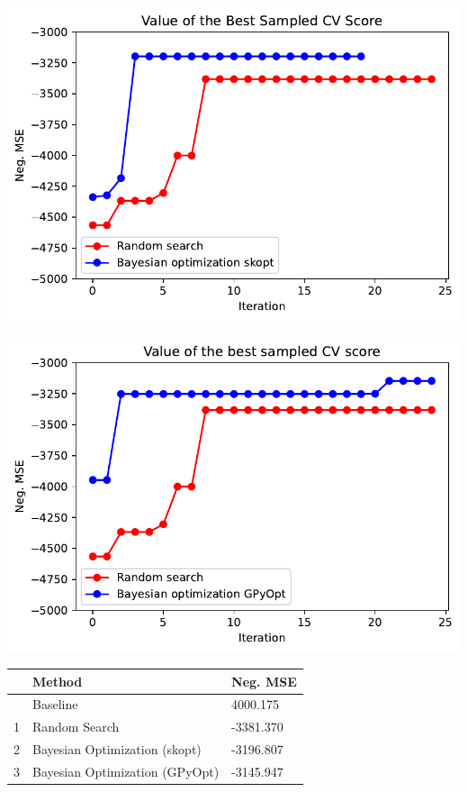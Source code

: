 \documentclass[
  12pt,
  letterpaper,
  DIV=11,
  numbers=noendperiod]{scrartcl}
\begin{document}
\includegraphics{ProyFinal_OptBayesiana_2024_files/figure-pdf/cell-16-output-1.pdf}

\includegraphics{ProyFinal_OptBayesiana_2024_files/figure-pdf/cell-17-output-1.pdf}

\begin{longtable}[]{@{}lll@{}}
\toprule\noalign{}
& Method & Neg. MSE \\
\midrule\noalign{}
\endhead
\bottomrule\noalign{}
\endlastfoot
0 & Baseline & 4000.175 \\
1 & Random Search & -3381.370 \\
2 & Bayesian Optimization (skopt) & -3196.807 \\
3 & Bayesian Optimization (GPyOpt) & -3145.947 \\
\end{longtable}
\end{document}
